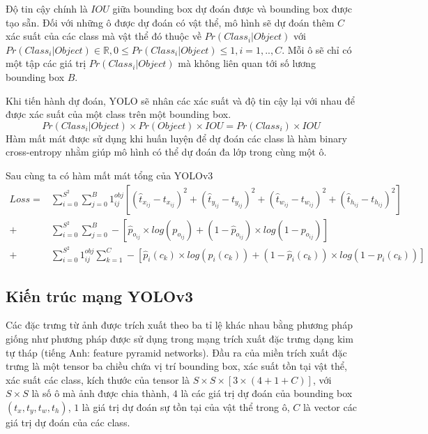 Độ tin cậy chính là $IOU$ giữa bounding box dự đoán được và bounding box được tạo sẵn. Đối với những ô được dự đoán có vật thể, mô hình sẽ dự đoán thêm $C$ xác suất của các class mà vật thể đó thuộc về $Pr \left( Class_i | Object \right)$ với $Pr \left( Class_i | Object \right) \in \mathbb{R}, 0 \leq Pr \left( Class_i | Object \right) \leq 1, i=1,..,C$. Mỗi ô sẽ chỉ có một tập các giá trị $Pr \left( Class_i | Object \right)$ mà không liên quan tới số lương bounding box $B$.

Khi tiến hành dự đoán, YOLO sẽ nhân các xác suất và độ tin cậy lại với nhau để được xác suất của một class trên một bounding box. 
\begin{equation}
	Pr \left( Class_i | Object \right) \times Pr(Object) \times IOU = Pr \left( Class_i \right) \times IOU
\end{equation}
Hàm mất mát được sử dụng khi huấn luyện để dự đoán các class là hàm binary cross-entropy nhằm giúp mô hình có thể dự đoán đa lớp trong cùng một ô.

Sau cùng ta có hàm mất mát tổng của YOLOv3
\begin{align*}
	Loss =
		&\sum_{i=0}^{S^2} 
		\sum_{j=0}^{B}
		{\mathfrak{1}}^{obj}_{ij}
		\left[
			{
			\left(
				{\widehat{t}}_{x_{ij}}
				-
				t_{x_{ij}}
			\right)
			}^2
			+
			{
			\left(
				{\widehat{t}}_{y_{ij}}
				-
				t_{y_{ij}}
			\right)
			}^2
			+
			{
			\left(
				{\widehat{t}}_{w_{ij}}
				-
				t_{w_{ij}}
			\right)
			}^2
			+
			{
			\left(
				{\widehat{t}}_{h_{ij}}
				-
				t_{h_{ij}}
			\right)
			}^2
		\right]\\
		+
		&\sum_{i=0}^{S^2} 
		\sum_{j=0}^{B}
		-
		\left[
			{\widehat{p}}_{o_{ij}}
			\times
			log	\left(
					p_{o_{ij}}
				\right)
			+
			\left(
				1 
				- 
				{\widehat{p}}_{o_{ij}}
			\right)
			\times
			log	\left(
					1
					-
					p_{o_{ij}}
				\right)
		\right]\\
		+
		&\sum_{i=0}^{S^2} 
		{\mathfrak{1}}^{obj}_{ij}
		\sum_{k=1}^{C}
		-
		\left[
			{\widehat{p}}_{i} \left( c_k \right)
			\times
			log	\left(
					p_{i} \left( c_k \right)
				\right)
			+
			\left(
				1 
				- 
				{\widehat{p}}_{i} \left( c_k \right)
			\right)
			\times
			log	\left(
					1
					-
					p_{i} \left( c_k \right)
				\right)
		\right]
\end{align*}
\subsection{Kiến trúc mạng YOLOv3}
Các đặc trưng từ ảnh được trích xuất theo ba tỉ lệ khác nhau bằng phương pháp giống như phương pháp được sử dụng trong mạng trích xuất đặc trưng dạng kim tự tháp (tiếng Anh: feature pyramid networks). Đầu ra của miền trích xuất đặc trưng là một tensor ba chiều chứa vị trí bounding box, xác suất tồn tại vật thể, xác suất các class, kích thước của tensor là $S \times S \times [3 \times (4 + 1 + C)]$, với $S \times S$ là số ô mà ảnh được chia thành, $4$ là các giá trị dự đoán của bounding box $\left( t_x,t_y,t_w,t_h \right)$, $1$ là giá trị dự đoán sự tồn tại của vật thể trong ô, $C$ là vector các giá trị dự đoán của các class.

